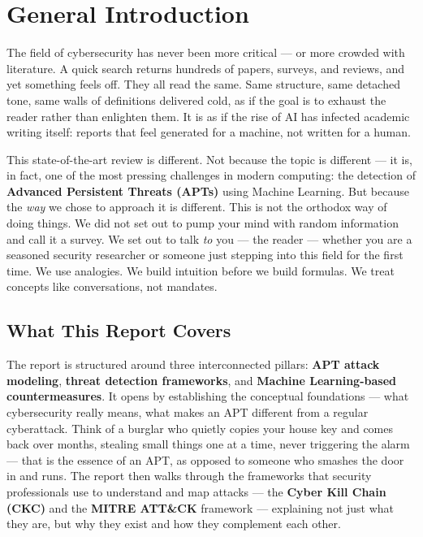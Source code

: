 ﻿\documentclass[11pt,a4paper]{report}
\begin{document}
\renewcommand\bibname{References} 



\tableofcontents
\newpage
\listoffigures
\newpage
\listoftables
\newpage
{} 

\chapter*{General Introduction}

The field of cybersecurity has never been more critical --- or more crowded
with literature. A quick search returns hundreds of papers, surveys, and
reviews, and yet something feels off. They all read the same. Same structure,
same detached tone, same walls of definitions delivered cold, as if the goal
is to exhaust the reader rather than enlighten them. It is as if the rise of
AI has infected academic writing itself: reports that feel generated for a
machine, not written for a human.

This state-of-the-art review is different. Not because the topic is different
--- it is, in fact, one of the most pressing challenges in modern computing:
the detection of \textbf{Advanced Persistent Threats (APTs)} using Machine
Learning. But because the \textit{way} we chose to approach it is different.
This is not the orthodox way of doing things. We did not set out to pump your
mind with random information and call it a survey. We set out to talk
\textit{to} you --- the reader --- whether you are a seasoned security
researcher or someone just stepping into this field for the first time. We use
analogies. We build intuition before we build formulas. We treat concepts like
conversations, not mandates.

\section*{What This Report Covers}

The report is structured around three interconnected pillars:
\textbf{APT attack modeling}, \textbf{threat detection frameworks}, and
\textbf{Machine Learning-based countermeasures}. It opens by establishing the
conceptual foundations --- what cybersecurity really means, what makes an APT
different from a regular cyberattack. Think of a burglar who quietly copies
your house key and comes back over months, stealing small things one at a
time, never triggering the alarm --- that is the essence of an APT, as opposed
to someone who smashes the door in and runs. The report then walks through
the frameworks that security professionals use to understand and map attacks
--- the \textbf{Cyber Kill Chain (CKC)} and the \textbf{MITRE ATT\&CK}
framework --- explaining not just what they are, but why they exist and how
they complement each other.
\end{document}
